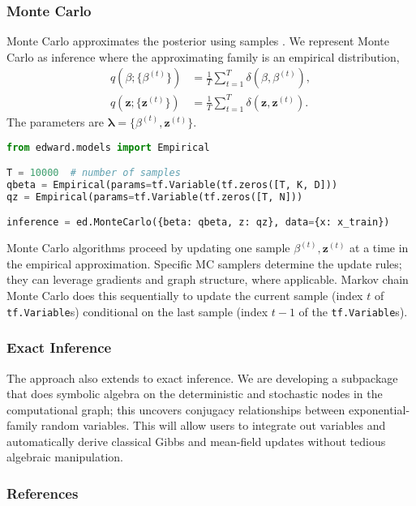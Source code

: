 \subsubsection{Monte Carlo}

Monte Carlo approximates the posterior using samples
\citep{robert1999monte}. We represent Monte Carlo as inference where
the approximating family is an empirical distribution,
\begin{align*}
q(\beta; \{\beta^{(t)}\})
&= \frac{1}{T}\sum_{t=1}^T \delta(\beta, \beta^{(t)}), \\[1.5ex]
q(\mathbf{z}; \{\mathbf{z}^{(t)}\})
&= \frac{1}{T}\sum_{t=1}^T \delta(\mathbf{z}, \mathbf{z}^{(t)}).
\end{align*}
The parameters are $\mathbf{\lambda}=\{\beta^{(t)},\mathbf{z}^{(t)}\}$.
\begin{lstlisting}[language=Python]
from edward.models import Empirical

T = 10000  # number of samples
qbeta = Empirical(params=tf.Variable(tf.zeros([T, K, D]))
qz = Empirical(params=tf.Variable(tf.zeros([T, N]))

inference = ed.MonteCarlo({beta: qbeta, z: qz}, data={x: x_train})
\end{lstlisting}
Monte Carlo
algorithms proceed by updating one sample $\beta^{(t)},\mathbf{z}^{(t)}$ at a time in the empirical
approximation.
Specific \gls{MC} samplers determine the update rules;
they can leverage gradients and graph structure, where applicable.
Markov chain Monte Carlo does this sequentially to update
the current sample (index $t$ of \texttt{tf.Variable}s) conditional on
the last sample (index $t-1$ of the \texttt{tf.Variable}s).

\subsubsection{Exact Inference}

The approach also extends to exact inference. We are developing a
subpackage that does symbolic algebra on the deterministic and
stochastic nodes in the computational graph; this uncovers conjugacy
relationships between exponential-family random variables. This will
allow users to integrate out variables and automatically derive
classical Gibbs and mean-field updates \citep{bishop2006pattern} without
tedious algebraic manipulation.

\subsubsection{References}\label{references}
